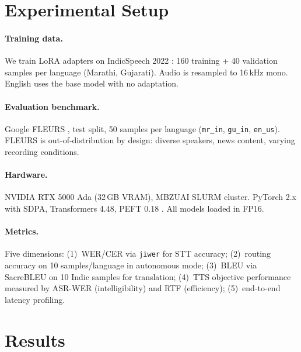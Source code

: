 \documentclass[11pt]{article}
\begin{document}
\section{Experimental Setup}\label{sec:setup}

\paragraph{Training data.}
We train LoRA adapters on IndicSpeech 2022 \citep{indicspeech2022}: 160 training + 40 validation samples per language (Marathi, Gujarati).  Audio is resampled to 16\,kHz mono.  English uses the base model with no adaptation.

\paragraph{Evaluation benchmark.}
Google FLEURS \citep{conneau2023fleurs}, test split, 50 samples per language (\texttt{mr\_in}, \texttt{gu\_in}, \texttt{en\_us}).  FLEURS is out-of-distribution by design: diverse speakers, news content, varying recording conditions.

\paragraph{Hardware.}
NVIDIA RTX 5000 Ada (32\,GB VRAM), MBZUAI SLURM cluster.  PyTorch 2.x with SDPA, Transformers 4.48, PEFT 0.18 \citep{peft2023, wolf2020transformers}.  All models loaded in FP16.

\paragraph{Metrics.}
Five dimensions: (1)~WER/CER via \texttt{jiwer} for STT accuracy; (2)~routing accuracy on 10 samples/language in autonomous mode; (3)~BLEU via SacreBLEU on 10 Indic samples for translation; (4)~TTS objective performance measured by ASR-WER (intelligibility) and RTF (efficiency); (5)~end-to-end latency profiling.

\section{Results}\label{sec:results}
\end{document}
